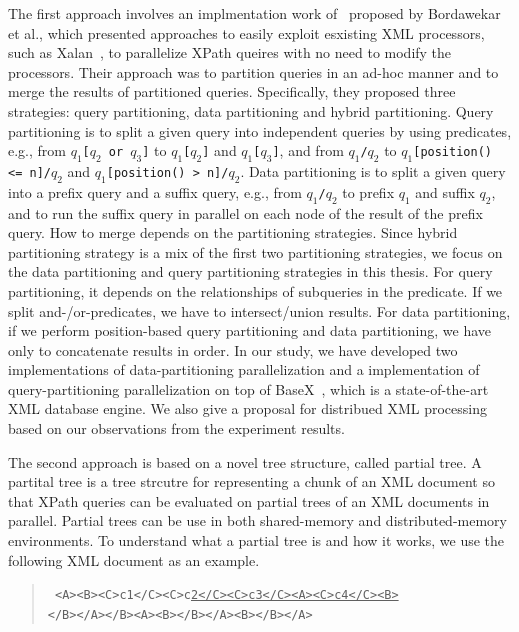 The first approach involves an implmentation work of~\cite{BoLS09} proposed by
Bordawekar et al., which presented approaches to easily exploit esxisting XML
processors, such as Xalan~\cite{xalan}, to parallelize XPath queires with no
need to modify  the processors. Their approach was to partition queries in an
ad-hoc manner and to merge the results of partitioned queries. Specifically,
they proposed three strategies: query partitioning, data partitioning and hybrid
partitioning. Query partitioning is to split a given query into independent
queries by using predicates, e.g., from \texttt{$q_1$[$q_2$ or $q_3$]} to
\texttt{$q_1$[$q_2$]} and \texttt{$q_1$[$q_3$]}, and from \texttt{$q_1$/$q_2$}
to \texttt{$q_1$[position() <= n]/$q_2$} and \texttt{$q_1$[position() >
n]/$q_2$}. Data partitioning is to split a given query into a prefix query and a
suffix query, e.g., from \texttt{$q_1$/$q_2$} to prefix $q_1$ and suffix $q_2$,
and to run the suffix query in parallel on each node of the result of the prefix
query. How to merge depends on the partitioning strategies.  Since hybrid
partitioning strategy is a mix of the first two partitioning strategies, we
focus on the data partitioning and query partitioning strategies in this thesis.
For query partitioning, it depends on the relationships of subqueries in the
predicate. If we split and-/or-predicates, we have to intersect/union results.
For data partitioning, if we perform position-based query partitioning and data
partitioning, we have only to concatenate results in order. In our study, we
have developed two implementations of data-partitioning parallelization and a
implementation of query-partitioning parallelization on top of
BaseX~\cite{basex864}, which is a state-of-the-art XML database engine. We also
give a proposal for distribued XML processing based on our observations from the
experiment results.


The second approach is based on a novel tree structure, called partial tree. A
partital tree is a tree strcutre for representing a chunk of an XML document so
that XPath queries can be evaluated on partial trees of an XML documents in
parallel. Partial trees can be use in both shared-memory and distributed-memory
environments. To understand what a partial tree is and how it works, we use the
following XML document as an example.

\begin{quote}\small\tt
	<A><B><C>c1</C><C>c\underline{2</C><C>c3</C><A><C>c4</C><B>}\\
	</B></A></B><A><B></B></A><B></B></A> \end{quote}


